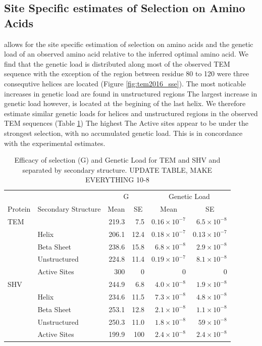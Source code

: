 \documentclass[12pt]{article}
\begin{document}
\subsection*{Site Specific estimates of Selection on Amino Acids}
\selac allows for the site specific estimation of selection on amino acids and the genetic load of an observed amino acid relative to the inferred optimal amino acid.
We find that the genetic load is distributed along most of the observed TEM sequence with the exception of the region between residue 80 to 120 were three consequtive helices are located (Figure \ref{fig:tem2016_sse}). 
The most noticable increases in genetic load are found in unstructured regions
The largest increase in genetic load however, is located at the begining of the last helix.
We therefore estimate similar genetic loads for helices and unstructured regions in the observed TEM sequences (Table \ref{tab:selection})
The highest 
The Active sites appear to be under the strongest selection, with no accumulated genetic load.
This is in concordance with the experimental estimates.

\begin{table}
  \centering
  \begin{tabular}{llrrrr}
    & & \multicolumn{2}{c}{G} & \multicolumn{2}{c}{Genetic Load} \\ 
    Protein & Secondary Structure	& \multicolumn{1}{c}{Mean} & \multicolumn{1}{c}{SE} & \multicolumn{1}{c}{Mean} & \multicolumn{1}{c}{SE} \\ \hline 
    TEM	&		& 219.3 & 7.5 & $0.16\times10^{-7}$ & $6.5\times10^{-8}$ \\
    &Helix 		& 206.1 & 12.4 & $0.18\times10^{-7}$ & $0.13\times10^{-7}$ \\
    &Beta Sheet 	& 238.6 & 15.8 & $6.8\times10^{-8}$ & $2.9\times10^{-8}$ \\
    &Unstructured 	& 224.8 & 11.4 & $0.19\times10^{-7}$ & $8.1\times10^{-8}$ \\
    &Active Sites 	& 300   & 0    & 0      & 0      \\ \hline
    
    SHV&		& 244.9 & 6.8  & $4.0\times10^{-8}$ & $1.9\times10^{-8}$ \\
    &Helix		& 234.6 & 11.5 & $7.3\times10^{-8}$ & $4.8\times10^{-8}$ \\
    &Beta Sheet 	& 253.1 & 12.8 & $2.1\times10^{-8}$ & $1.1\times10^{-8}$ \\
    &Unstructured	& 250.3 & 11.0 & $1.8\times10^{-8}$ & $59\times10^{-8}$  \\
    &Active Sites	& 199.9 & 100  & $2.4\times10^{-8}$ & $2.4\times10^{-8}$ \\

  \end{tabular}
  \caption{Efficacy of selection (G) and Genetic Load for TEM and SHV and separated by secondary structure. UPDATE TABLE, MAKE EVERYTHING 10-8}
  \label{tab:selection}
\end{table}
\end{document}
